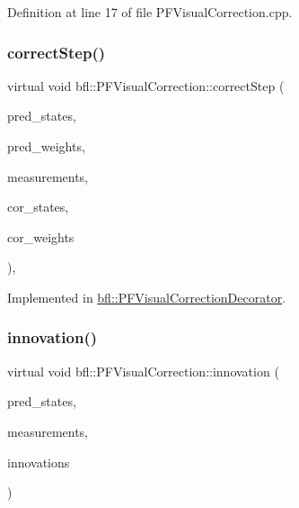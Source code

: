 Definition at line 17 of file P\+F\+Visual\+Correction.\+cpp.

\mbox{\label{classbfl_1_1PFVisualCorrection_a44a0ad575d02b89d5571b15ce585cf8f}} 
\subsubsection{\texorpdfstring{correct\+Step()}{correctStep()}}
{\footnotesize\ttfamily virtual void bfl\+::\+P\+F\+Visual\+Correction\+::correct\+Step (\begin{DoxyParamCaption}\item[{const Eigen\+::\+Ref$<$ const Eigen\+::\+Matrix\+Xf $>$ \&}]{pred\+\_\+states,  }\item[{const Eigen\+::\+Ref$<$ const Eigen\+::\+Vector\+Xf $>$ \&}]{pred\+\_\+weights,  }\item[{cv\+::\+Input\+Array}]{measurements,  }\item[{Eigen\+::\+Ref$<$ Eigen\+::\+Matrix\+Xf $>$}]{cor\+\_\+states,  }\item[{Eigen\+::\+Ref$<$ Eigen\+::\+Vector\+Xf $>$}]{cor\+\_\+weights }\end{DoxyParamCaption})\hspace{0.3cm}{\ttfamily [protected]}, {}}



Implemented in \mbox{\hyperlink{classbfl_1_1PFVisualCorrectionDecorator_a0e02eb41e938fc083c18bff3ddf9b6d3}{bfl\+::\+P\+F\+Visual\+Correction\+Decorator}}.

\mbox{\label{classbfl_1_1PFVisualCorrection_acbc20b602ce5277407bf6afe8d7b4b29}} 
\subsubsection{\texorpdfstring{innovation()}{innovation()}}
{\footnotesize\ttfamily virtual void bfl\+::\+P\+F\+Visual\+Correction\+::innovation (\begin{DoxyParamCaption}\item[{const Eigen\+::\+Ref$<$ const Eigen\+::\+Matrix\+Xf $>$ \&}]{pred\+\_\+states,  }\item[{cv\+::\+Input\+Array}]{measurements,  }\item[{Eigen\+::\+Ref$<$ Eigen\+::\+Matrix\+Xf $>$}]{innovations }\end{DoxyParamCaption})\hspace{0.3cm}{\ttfamily [pure virtual]}}



